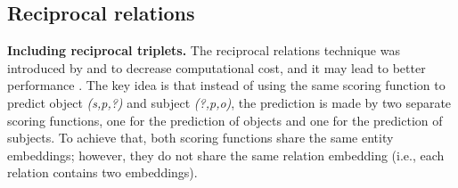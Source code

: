 \begin{table}[!htbp]
\centering
{}
\caption{Reproduction results of the best models of \citet{chen2021relation} using LibKGE after applying changes}
\label{tab:Successfully reproducing}
\end{table}

\subsection{Reciprocal relations}

\noindent\textbf{Including reciprocal triplets.}
The reciprocal relations technique was introduced by \citet{kazemi2018simple} and \citet{lacroix2018canonical} to decrease computational cost, and it may lead to better performance \citep{lacroix2018canonical}. The key idea is that instead of using the same scoring function to predict object \textit{(s,p,?)} and subject \textit{(?,p,o)}, the prediction is made by two separate scoring functions, one for the prediction of objects and one for the prediction of subjects. To achieve that, both scoring functions share the same entity embeddings; however, they do not share the same relation embedding (i.e., each relation contains two embeddings).


